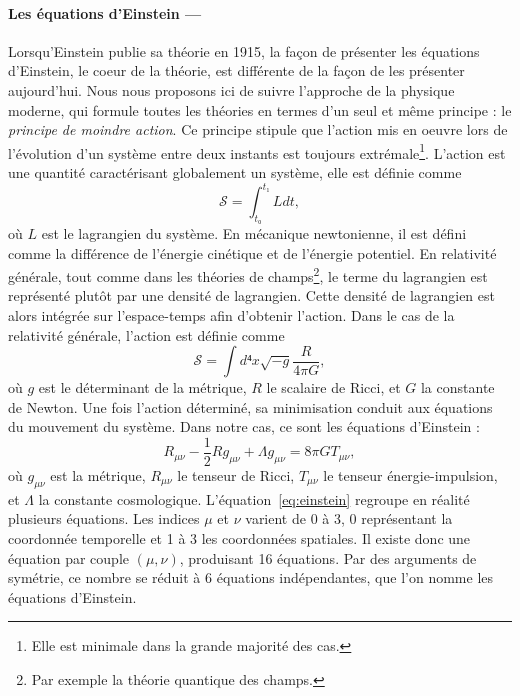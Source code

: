 \documentclass[11pt, twoside, a4paper, openright]{report}
\begin{document}

\paragraph{Les équations d'Einstein —}
Lorsqu'Einstein publie sa théorie en 1915, la façon de présenter les équations d'Einstein, le coeur de la théorie, est différente de la façon de les présenter aujourd'hui. Nous nous proposons ici de suivre l'approche de la physique moderne, qui formule toutes les théories en termes d'un seul et même principe : le \emph{principe de moindre action}. Ce principe stipule que l'action mis en oeuvre lors de l'évolution d'un système entre deux instants est toujours extrémale\footnote{Elle est minimale dans la grande majorité des cas.}. L'action est une quantité caractérisant globalement un système, elle est définie comme
\begin{equation}
  \label{eq:action}
  \mathcal{S} = \int_{t₀}^{t₁} L dt,
\end{equation}
où $L$ est le lagrangien du système. En mécanique newtonienne, il est défini comme la différence de l'énergie cinétique et de l'énergie potentiel. En relativité générale, tout comme dans les théories de champs\footnote{Par exemple la théorie quantique des champs.}, le terme du lagrangien est représenté plutôt par une densité de lagrangien. Cette densité de lagrangien est alors intégrée sur l'espace-temps afin d'obtenir l'action. Dans le cas de la relativité générale, l'action est définie comme
\begin{equation}
  \label{eq:actionrg}
  \mathcal{S} = \int d⁴x \sqrt{-g} \frac{R}{4 \pi G} ,
\end{equation}
où $g$ est le déterminant de la métrique, $R$ le scalaire de Ricci, et $G$ la constante de Newton. Une fois l'action déterminé, sa minimisation conduit aux équations du mouvement du système. Dans notre cas, ce sont les équations d'Einstein :
\begin{equation}
  \label{eq:einstein}
  R_{\mu \nu} - \frac{1}{2} R g_{\mu \nu} + \Lambda g_{\mu \nu} = 8 \pi G T_{\mu \nu},
\end{equation}
où $g_{\mu \nu}$ est la métrique, $R_{\mu \nu}$ le tenseur de Ricci, $T_{\mu \nu}$ le tenseur énergie-impulsion, et $\Lambda$ la constante cosmologique. L'équation~\ref{eq:einstein} regroupe en réalité plusieurs équations. Les indices $\mu$ et $\nu$ varient de 0 à 3, 0 représentant la coordonnée temporelle et 1 à 3 les coordonnées spatiales. Il existe donc une équation par couple $(\mu, \nu)$, produisant 16 équations. Par des arguments de symétrie, ce nombre se réduit à 6 équations indépendantes, que l'on nomme les équations d'Einstein.
\end{document}

